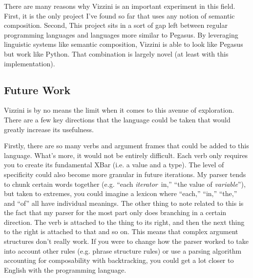 \documentclass[titlepage]{article}
\newcommand{\langName}{Vizzini}
\begin{document}
There are many reasons why \langName{} is an important experiment in this field. First, it is the only project I've found so far that uses any notion of semantic composition. Second, This project sits in a sort of gap left between regular programming languages and languages more similar to Pegasus. By leveraging linguistic systems like semantic composition, \langName{} is able to look like Pegasus but work like Python. That combination is largely novel (at least with this implementation).

\subsection*{Future Work}
\langName{} is by no means the limit when it comes to this avenue of exploration. There are a few key directions that the language could be taken that would greatly increase its usefulness.

Firstly, there are so many verbs and argument frames that could be added to this language. What's more, it would not be entirely difficult. Each verb only requires you to create its fundamental XBar (i.e. a value and a type). The level of specificity could also become more granular in future iterations. My parser tends to chunk certain words together (e.g. ``each \textlangle\textit{iterator}\textrangle\ in,'' ``the value of \textlangle\textit{variable}\textrangle''), but taken to extremes, you could imagine a lexicon where ``each,'' ``in,'' ``the,'' and ``of'' all have individual meanings. The other thing to note related to this is the fact that my parser for the most part only does branching in a certain direction. The verb is attached to the thing to its right, and then the next thing to the right is attached to that and so on. This means that complex argument structures don't really work. If you were to change how the parser worked to take into account other rules (e.g. phrase structure rules) or use a parsing algorithm accounting for composability with backtracking, you could get a lot closer to English with the programming language.
\end{document}
